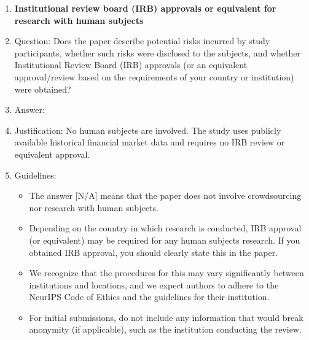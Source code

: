 \documentclass{article}
\begin{document}
\begin{enumerate}
\item {\bf Institutional review board (IRB) approvals or equivalent for research with human
subjects}
    \item[] Question: Does the paper describe potential risks incurred by study participants, whether
such risks were disclosed to the subjects, and whether Institutional Review Board (IRB)
approvals (or an equivalent approval/review based on the requirements of your country or
institution) were obtained?
    \item[] Answer: \answerNA{}
    \item[] Justification: No human subjects are involved. The study uses publicly available
    historical financial market data and requires no IRB review or equivalent approval.
    \item[] Guidelines:
    \begin{itemize}
        \item The answer [N/A] means that the paper does not involve crowdsourcing nor research
with human subjects.
        \item Depending on the country in which research is conducted, IRB approval (or equivalent)
may be required for any human subjects research. If you obtained IRB approval, you
should clearly state this in the paper.
        \item We recognize that the procedures for this may vary significantly between institutions
and locations, and we expect authors to adhere to the NeurIPS Code of Ethics and the
guidelines for their institution.
        \item For initial submissions, do not include any information that would break anonymity (if
applicable), such as the institution conducting the review.
    \end{itemize}


\end{enumerate}
\end{document}
